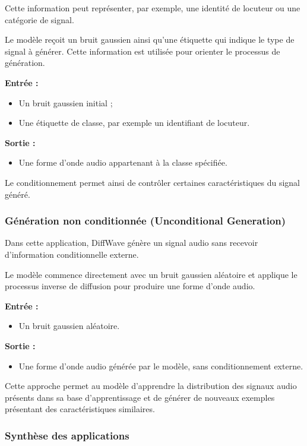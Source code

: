 Cette information peut représenter, par exemple, une
identité de locuteur ou une catégorie de signal.

Le modèle reçoit un bruit gaussien ainsi qu'une étiquette
qui indique le type de signal à générer. Cette information
est utilisée pour orienter le processus de génération.

\textbf{Entrée :}
\begin{itemize}
    \item Un bruit gaussien initial ;
    \item Une étiquette de classe, par exemple un identifiant
    de locuteur.
\end{itemize}

\textbf{Sortie :}
\begin{itemize}
    \item Une forme d'onde audio appartenant à la classe
    spécifiée.
\end{itemize}

Le conditionnement permet ainsi de contrôler certaines
caractéristiques du signal généré.

\subsubsection{Génération non conditionnée
(Unconditional Generation)}

Dans cette application, DiffWave génère un signal audio
sans recevoir d'information conditionnelle externe.

Le modèle commence directement avec un bruit gaussien
aléatoire et applique le processus inverse de diffusion
pour produire une forme d'onde audio.

\textbf{Entrée :}
\begin{itemize}
    \item Un bruit gaussien aléatoire.
\end{itemize}

\textbf{Sortie :}
\begin{itemize}
    \item Une forme d'onde audio générée par le modèle,
    sans conditionnement externe.
\end{itemize}

Cette approche permet au modèle d'apprendre la distribution
des signaux audio présents dans sa base d'apprentissage
et de générer de nouveaux exemples présentant des
caractéristiques similaires.

\subsubsection{Synthèse des applications}

